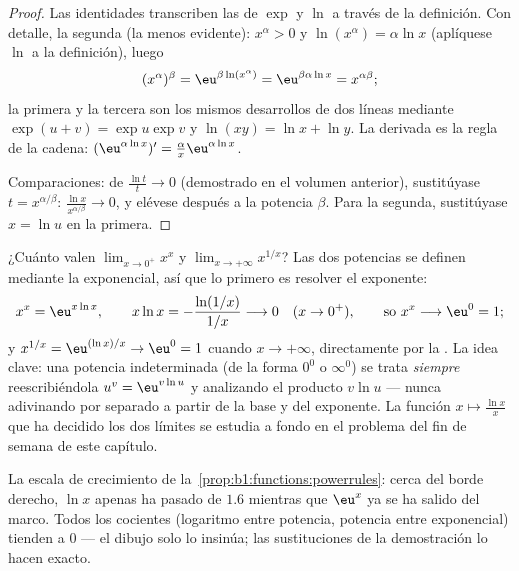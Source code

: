 \begin{proof}
Las identidades transcriben las de $\exp$ y $\ln$ a través de la
definición. Con detalle, la segunda (la menos evidente): $x^\alpha
> 0$ y $\ln(x^\alpha) = \alpha\ln x$ (aplíquese $\ln$ a la
definición), luego
\[
(x^\alpha)^\beta = \eu^{\beta\ln(x^\alpha)}
= \eu^{\beta\alpha\ln x} = x^{\alpha\beta} ;
\]
la primera y la tercera son los mismos desarrollos de dos líneas
mediante $\exp(u + v) = \exp u\exp v$ y $\ln(xy) = \ln x + \ln y$. La
derivada es la regla de la cadena: $(\eu^{\alpha\ln x})' =
\frac{\alpha}{x} \eu^{\alpha\ln x}$.

Comparaciones: de $\frac{\ln t}{t} \to 0$ (demostrado en el volumen
anterior), sustitúyase $t = x^{\alpha/\beta}$:
$\frac{\ln x}{x^{\alpha/\beta}} \to 0$, y elévese después a la potencia
$\beta$. Para la segunda, sustitúyase $x = \ln u$ en la primera.
\end{proof}

\begin{example}\label{ex:b1:functions:xx}
¿Cuánto valen $\lim_{x \to 0^+} x^x$ y $\lim_{x \to +\infty}
x^{1/x}$? Las dos potencias se definen mediante la exponencial, así que
lo primero es resolver el exponente:
\[
x^x = \eu^{x\ln x}, \qquad
x\ln x = -\frac{\ln(1/x)}{1/x} \longrightarrow 0
\quad (x \to 0^+),
\qquad\text{so } x^x \longrightarrow \eu^0 = 1 ;
\]
y $x^{1/x} = \eu^{(\ln x)/x} \to \eu^0 = 1$ cuando $x \to +\infty$,
directamente por la . La idea clave: una
potencia indeterminada (de la forma $0^0$ o $\infty^0$) se trata
\emph{siempre} reescribiéndola $u^v = \eu^{v\ln u}$ y analizando el
producto $v \ln u$ --- nunca adivinando por separado a partir de la
base y del exponente. La función $x \mapsto \frac{\ln x}{x}$ que ha
decidido los dos límites se estudia a fondo en el problema del fin de
semana de este capítulo.
\end{example}

\begin{omfigure}

{\small La escala de crecimiento de
la~\cref{prop:b1:functions:powerrules}: cerca del borde derecho,
$\ln x$ apenas ha pasado de $1.6$ mientras que $\eu^x$ ya se ha salido
del marco. Todos los cocientes (logaritmo entre potencia, potencia
entre exponencial) tienden a $0$ --- el dibujo solo lo insinúa; las
sustituciones de la demostración lo hacen exacto.}
\end{omfigure}

